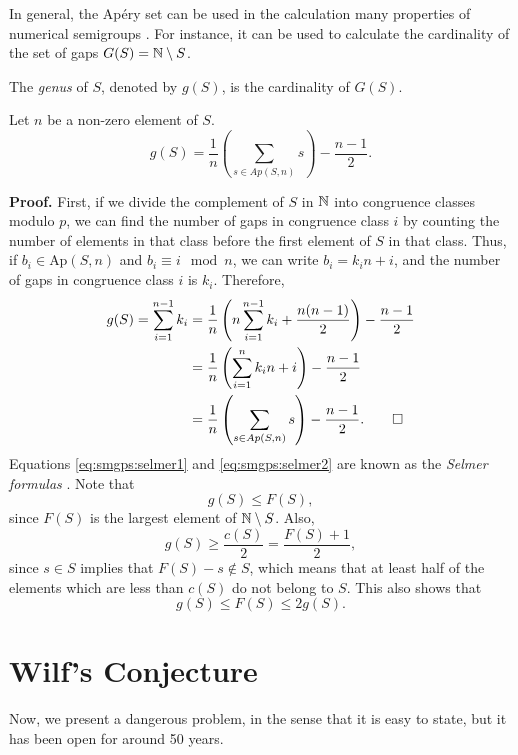 In general, the Apéry set can be used in the calculation many properties of numerical semigroups \cite{apery1946branches}. For instance, it can be used to calculate the cardinality of the set of gaps $G(S) = \mathbb{N} \setminus S$.

\begin{definition}\label{def:smgps:genus}
    The \textit{genus} of $S$, denoted by $g(S)$, is the cardinality of $G(S)$.
\end{definition}

\begin{proposition} Let $n$ be a non-zero element of $S$. 
    \begin{equation}\label{eq:smgps:selmer2}
        g(S) = \frac{1}{n}\left(\sum_{s \in Ap(S, n)} s\right) - \frac{n - 1}{2}.
    \end{equation}
\end{proposition}
\textbf{Proof. } First, if we divide the complement of $S$ in $\mathbb{N}$ into congruence classes modulo $p$, we can find the number of gaps in congruence class $i$ by counting the number of elements in that class before the first element of $S$ in that class. Thus, if $b_i \in \text{Ap}(S, n)$ and $b_i \equiv i \mod n$, we can write $b_i = k_i n + i$, and the number of gaps in congruence class $i$ is $k_i$. Therefore,
\begin{align*}
    g(S) = \sum_{i = 1}^{n - 1} k_i &=  \frac{1}{n}\left(n\sum_{i = 1}^{n - 1} k_i + \frac{n(n - 1)}{2}\right) - \frac{n - 1}{2} \\
    &= \frac{1}{n}\left(\sum_{i = 1}^n k_i n + i \right) - \frac{n - 1}{2} \\
    &= \frac{1}{n}\left(\sum_{s \in Ap(S, n)} s \right) - \frac{n - 1}{2}. \qed
\end{align*}
Equations \ref{eq:smgps:selmer1} and \ref{eq:smgps:selmer2} are known as the \textit{Selmer formulas} \cite{selmer1977linear}. Note that \[g(S) \leq F(S),\] since $F(S)$ is the largest element of $\mathbb{N} \setminus S$. Also, 
\[g(S) \geq \frac{c(S)}{2} = \frac{F(S) + 1}{2},\]
since $s \in S$ implies that $F(S) - s \notin S$, which means that at least half of the elements which are less than $c(S)$ do not belong to $S$.  This also shows that
\begin{equation}\label{eq:smgps:frobgenus}
    g(S) \leq F(S) \leq 2g(S).
\end{equation}

\section{Wilf's Conjecture}\label{sec:smgps:theme2}

Now, we present a dangerous problem, in the sense that it is easy to state, but it has been open for around 50 years. \par
